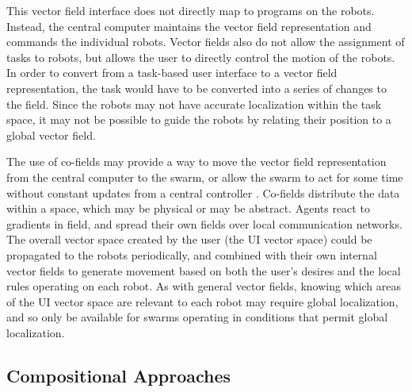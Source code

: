This vector field interface does not directly map to programs on the robots. 
Instead, the central computer maintains the vector field representation and commands the individual robots.
Vector fields also do not allow the assignment of tasks to robots, but allows the user to directly control the motion of the robots. 
In order to convert from a task-based user interface to a vector field representation, the task would have to be converted into a series of changes to the field.
Since the robots may not have accurate localization within the task space, it may not be possible to guide the robots by relating their position to a global vector field. 

The use of co-fields may provide a way to move the vector field representation from the central computer to the swarm, or allow the swarm to act for some time without constant updates from a central controller \citep{mamei2003co}.
Co-fields distribute the data within a space, which may be physical or may be abstract. 
Agents react to gradients in field, and spread their own fields over local communication networks. 
The overall vector space created by the user (the UI vector space) could be propagated to the robots periodically, and combined with their own internal vector fields to generate movement based on both the user's desires and the local rules operating on each robot. 
As with general vector fields, knowing which areas of the UI vector space are relevant to each robot may require global localization, and so only be available for swarms operating in conditions that permit global localization. 

\subsection{Compositional Approaches}

